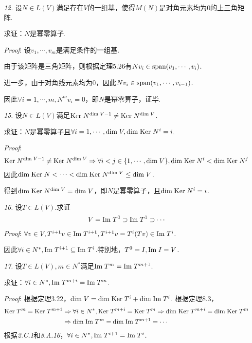 \newpage

\textit{12.}
设$N \in L(V)$满足存在$V$的一组基，使得$M(N)$是对角元素均为$0$的上三角矩阵.

求证：$N$是幂零算子.

\textit{Proof}:
设$v_1,\cdots,v_m$是满足条件的一组基.

由于该矩阵是三角矩阵，则根据定理5.26有$Nv_i \in \mathrm{span} (v_1,\cdots,v_i)$.

进一步，由于对角线元素均为$0$，因此$Nv_i \in \mathrm{span} (v_1,\cdots,v_{i-1})$.

因此$\forall i=1,\cdots,m,N^m v_i=0$，即$N$是幂零算子，证毕.

\hspace*{\fill}

\textit{15.}
设$N \in L(V)$满足$\mathrm{Ker \;} N^{\mathrm{dim \;} V-1} \ne \mathrm{Ker \;} N^{\mathrm{dim \;} V}$.

求证：$N$是幂零算子且$\forall i=1,\cdots,\mathrm{dim \;} V,\mathrm{dim \;} \mathrm{Ker \;} N^i=i$.

\textit{Proof}:
    \begin{align*}
        \mathrm{Ker \;} N^{\mathrm{dim \;} V-1} \ne \mathrm{Ker \;} N^{\mathrm{dim \;} V} \Rightarrow 
        \forall i<j \in \{1,\cdots,\mathrm{dim \;} V\},\mathrm{dim \;} \mathrm{Ker \;} N^i<\mathrm{dim \;} \mathrm{Ker \;} N^j
    \end{align*}
因此$\mathrm{dim \;} \mathrm{Ker \;} N<\cdots<\mathrm{dim \;} \mathrm{Ker \;} N^{\mathrm{dim \;} V} \leq \mathrm{dim \;} V$.

得到$\mathrm{dim \;} \mathrm{Ker \;} N^{\mathrm{dim \;} V}=\mathrm{dim \;} V$，即$N$是幂零算子，且$\mathrm{dim \;} \mathrm{Ker \;} N^i=i$.

\hspace*{\fill}

\textit{16.}
设$T \in L(V)$.求证
    \begin{align*}
        V=\mathrm{Im \;} T^0 \supset \mathrm{Im \;} T^1 \supset \cdots
    \end{align*}
\textit{Proof}:
$\forall v \in V,T^{i+1}v \in \mathrm{Im \;} T^{i+1},T^{i+1}v=T^i(Tv) \in \mathrm{Im \;} T^i$.

因此$\forall i \in N^*,\mathrm{Im \;} T^{i+1} \subseteq \mathrm{Im \;} T^i$.特别地，$T^0=I,\mathrm{Im \;} I=V$.

\hspace*{\fill}

\textit{17.}
设$T \in L(V),m \in N^*$满足$\mathrm{Im \;} T^m=\mathrm{Im \;} T^{m+1}$.

求证：$\forall i \in N^*,\mathrm{Im \;} T^{m+i}=\mathrm{Im \;} T^m$.

\textit{Proof}:
根据定理3.22，$\mathrm{dim \;} V=\mathrm{dim \;} \mathrm{Ker \;} T^i+\mathrm{dim \;} \mathrm{Im \;} T^i$.
根据定理8.3，
    \begin{align*}
        \mathrm{Ker \;} T^m=\mathrm{Ker \;} T^{m+1} & \Rightarrow \forall i \in N^*,\mathrm{Ker \;} T^{m+i}=\mathrm{Ker \;} T^m
        \Rightarrow \mathrm{dim \;} \mathrm{Ker \;} T^{m+i}=\mathrm{dim \;} \mathrm{Ker \;} T^m \\
        & \Rightarrow \mathrm{dim \;} \mathrm{Im \;} T^m=\mathrm{dim \;} \mathrm{Im \;} T^{m+1}=\cdots
    \end{align*}
根据\textit{2.C.1}和\textit{8.A.16}，$\forall i \in N^*,\mathrm{Im \;} T^{i+1}=\mathrm{Im \;} T^i$.

